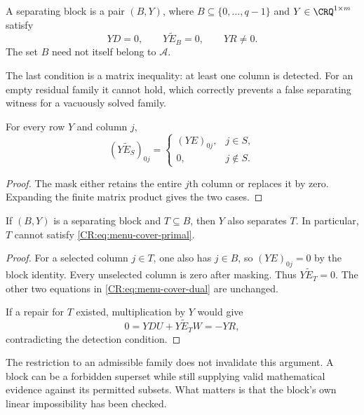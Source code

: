 \begin{CRdefinition}
A separating block is a pair $(B,Y)$, where $B\subseteq\{0,\ldots,q-1\}$ and $Y\in\CRQ^{1\times m}$ satisfy
\begin{equation}
 YD=0,\qquad Y\widetilde E_B=0,\qquad YR\ne0.
 \label{CR:eq:menu-cover-dual}
\end{equation}
The set $B$ need not itself belong to $\mathcal A$.
\end{CRdefinition}

The last condition is a matrix inequality: at least one column is detected. For an empty residual family it cannot hold, which correctly prevents a false separating witness for a vacuously solved family.

\begin{CRlemma}
For every row $Y$ and column $j$,
\[
 (Y\widetilde E_S)_{0j}=
 \begin{cases}
 (YE)_{0j},&j\in S,\\
 0,&j\notin S.
 \end{cases}
\]
\end{CRlemma}
\begin{proof}
The mask either retains the entire $j$th column or replaces it by zero. Expanding the finite matrix product gives the two cases.
\end{proof}

\begin{CRtheorem}
If $(B,Y)$ is a separating block and $T\subseteq B$, then $Y$ also separates $T$. In particular, $T$ cannot satisfy \eqref{CR:eq:menu-cover-primal}.
\end{CRtheorem}
\begin{proof}
For a selected column $j\in T$, one also has $j\in B$, so $(YE)_{0j}=0$ by the block identity. Every unselected column is zero after masking. Thus $Y\widetilde E_T=0$. The other two equations in \eqref{CR:eq:menu-cover-dual} are unchanged.

If a repair for $T$ existed, multiplication by $Y$ would give
\[
 0=YDU+Y\widetilde E_TW=-YR,
\]
contradicting the detection condition.
\end{proof}

The restriction to an admissible family does not invalidate this argument. A block can be a forbidden superset while still supplying valid mathematical evidence against its permitted subsets. What matters is that the block's own linear impossibility has been checked.

